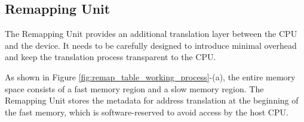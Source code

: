 \subsection{Remapping Unit}


The Remapping Unit provides an additional translation layer between the CPU and the device. It needs to be carefully designed to introduce minimal overhead and keep the translation process transparent to the CPU.

As shown in Figure \ref{fig:remap_table_working_process}-(a), the entire memory space consists of a fast memory region and a slow memory region. 
The Remapping Unit stores the metadata for address translation at the beginning of the fast memory, which is software-reserved to avoid access by the host CPU. 
